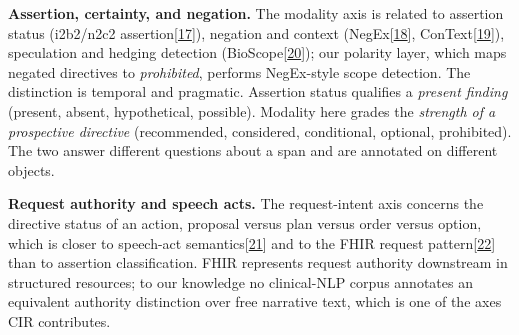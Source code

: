 \documentclass[3p,twocolumn]{elsarticle}
\begin{document}
\textbf{Assertion, certainty, and negation.} The modality axis is related to assertion status (i2b2/n2c2 assertion{[}\hyperref[r17]{17}{]}), negation and context (NegEx{[}\hyperref[r18]{18}{]}, ConText{[}\hyperref[r19]{19}{]}), speculation and hedging detection (BioScope{[}\hyperref[r20]{20}{]}); our polarity layer, which maps negated directives to \emph{prohibited}, performs NegEx-style scope detection. The distinction is temporal and pragmatic. Assertion status qualifies a \emph{present finding} (present, absent, hypothetical, possible). Modality here grades the \emph{strength of a prospective directive} (recommended, considered, conditional, optional, prohibited). The two answer different questions about a span and are annotated on different objects.

\textbf{Request authority and speech acts.} The request-intent axis concerns the directive status of an action, proposal versus plan versus order versus option, which is closer to speech-act semantics{[}\hyperref[r21]{21}{]} and to the FHIR request pattern{[}\hyperref[r22]{22}{]} than to assertion classification. FHIR represents request authority downstream in structured resources; to our knowledge no clinical-NLP corpus annotates an equivalent authority distinction over free narrative text, which is one of the axes CIR contributes.
\end{document}
